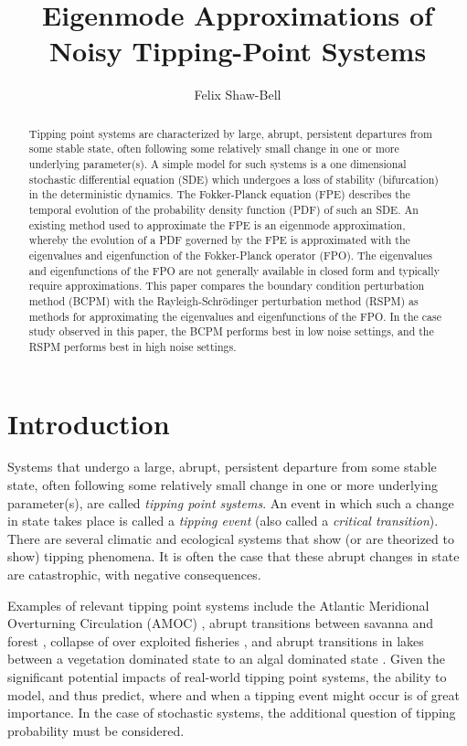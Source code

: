 \documentclass[11pt]{amsart}
\title{Eigenmode Approximations of Noisy Tipping-Point Systems}
\author{Felix Shaw-Bell}
\begin{document}
  \begin{abstract}
    Tipping point systems are characterized by large, abrupt, persistent departures from some stable state, often following some relatively small change in one or more underlying parameter(s). A simple model for such systems is a one dimensional stochastic differential equation (SDE) which undergoes a loss of stability (bifurcation) in the deterministic dynamics. The Fokker-Planck equation (FPE) describes the temporal evolution of the probability density function (PDF) of such an SDE. An existing method used to approximate the FPE is an eigenmode approximation, whereby the evolution of a PDF governed by the FPE is approximated with the eigenvalues and eigenfunction of the Fokker-Planck operator (FPO). The eigenvalues and eigenfunctions of the FPO are not generally available in closed form and typically require approximations. This paper compares the boundary condition perturbation method (BCPM) with the Rayleigh-Schrödinger perturbation method (RSPM) as methods for approximating the eigenvalues and eigenfunctions of the FPO. In the case study observed in this paper, the BCPM performs best in low noise settings, and the RSPM performs best in high noise settings.
  \end{abstract}
  \maketitle
  \section{Introduction}
  \label{sec:introduction}

Systems that undergo a large, abrupt, persistent departure from some stable state, often following some relatively small change in one or more underlying parameter(s), are called \emph{tipping point systems}. An event in which such a change in state takes place is called a \emph{tipping event} (also called a \emph{critical transition}). There are several climatic and ecological systems that show (or are theorized to show) tipping phenomena. It is often the case that these abrupt changes in state are catastrophic, with negative consequences. 

Examples of relevant tipping point systems include the Atlantic Meridional Overturning Circulation (AMOC) \cite{rahmstorf_2024_AMOC, vellinga_2002_global_climatic_impacts_of_AMOC,van_western_2024_physics_based_EWS_AMOC}, abrupt transitions between savanna and forest \cite{staver_2011_savanna_forest_biome_states}, collapse of over exploited fisheries \cite{beddington_1977_harvesting_natural_populations}, and abrupt transitions in lakes between a vegetation dominated state to an algal dominated state \cite{scheffer_1993_alternative_lake_equilibria}. Given the significant potential impacts of real-world tipping point systems, the ability to model, and thus predict, where and when a tipping event might occur is of great importance. In the case of stochastic systems, the additional question of tipping probability must be considered.
\end{document}
